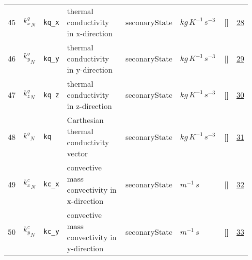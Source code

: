 \begin{longtable}{|p{1cm}|p{3cm}|p{3cm}|p{7cm}|p{3.0cm}|p{3cm}|p{2cm}|p{1cm}|}
                 \\
    45
             & \hypertarget{"v:45"}{ $ {k^{q}_{x}}_{N} $}
             & \verb|kq_x|
             & thermal conductivity in x-direction
             & \begin{lay}seconaryState \end{lay}
             & $ kg \,K^{-1} \,s^{-3} \, $
             & []
             & \hyperlink{"e:28"}{ 28 }
                 \\
    46
             & \hypertarget{"v:46"}{ $ {k^{q}_{y}}_{N} $}
             & \verb|kq_y|
             & thermal conductivity in y-direction
             & \begin{lay}seconaryState \end{lay}
             & $ kg \,K^{-1} \,s^{-3} \, $
             & []
             & \hyperlink{"e:29"}{ 29 }
                 \\
    47
             & \hypertarget{"v:47"}{ $ {k^{q}_{z}}_{N} $}
             & \verb|kq_z|
             & thermal conductivity in z-direction
             & \begin{lay}seconaryState \end{lay}
             & $ kg \,K^{-1} \,s^{-3} \, $
             & []
             & \hyperlink{"e:30"}{ 30 }
                 \\
    48
             & \hypertarget{"v:48"}{ $ {k^{q}}_{N} $}
             & \verb|kq|
             & Carthesian thermal conductivity vector
             & \begin{lay}seconaryState \end{lay}
             & $ kg \,K^{-1} \,s^{-3} \, $
             & []
             & \hyperlink{"e:31"}{ 31 }
                 \\
    49
             & \hypertarget{"v:49"}{ $ {k^{c}_{x}}_{N} $}
             & \verb|kc_x|
             & convective mass convectivity in x-direction
             & \begin{lay}seconaryState \end{lay}
             & $ m^{-1} \,s \, $
             & []
             & \hyperlink{"e:32"}{ 32 }
                 \\
    50
             & \hypertarget{"v:50"}{ $ {k^{c}_{y}}_{N} $}
             & \verb|kc_y|
             & convective mass convectivity in y-direction
             & \begin{lay}seconaryState \end{lay}
             & $ m^{-1} \,s \, $
             & []
             & \hyperlink{"e:33"}{ 33 }
                 \\

\end{longtable}
